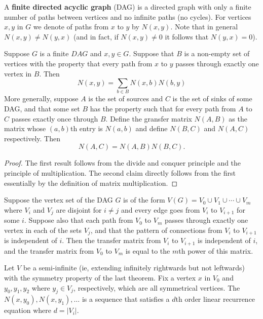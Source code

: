 \begin{definition}
A \textbf{finite directed acyclic graph} (DAG) is a directed graph with only a finite number of paths between vertices and no infinite paths (no cycles). For vertices $x, y$ in $G$ we denote of paths from $x$ to $y$ by $N(x, y)$. Note that in general $N(x, y) \neq N(y, x)$ (and in fact, if $N(x, y) \neq 0$ it follows that $N(y, x) = 0$).
\end{definition}

\begin{theorem}
Suppose $G$ is a finite $DAG$ and $x, y \in G$. Suppose that $B$ is a non-empty set of vertices with the property that every path from $x$ to $y$ passes through exactly one vertex in $B$. Then
\[N(x, y) = \sum_{b \in B}N(x, b)N(b, y)\]
More generally, suppose $A$ is the set of sources and $C$ is the set of sinks of some DAG, and that some set $B$ has the property such that for every path from $A$ to $C$ passes exactly once through $B$. Define the gransfer matrix $N(A, B)$ as the matrix whose $(a, b)$th entry is $N(a, b)$ and define $N(B, C)$ and $N(A, C)$ respectively. Then
\[N(A, C) = N(A, B)N(B, C).\]
\end{theorem}
\begin{proof}
The first result follows from the divide and conquer principle and the principle of multiplication. The second claim directly follows from the first essentially by the definition of matrix multiplication.
\end{proof}

\begin{theorem}
Suppose the vertex set of the DAG $G$ is of the form $V(G) = V_0 \cup V_1 \cup \cdots \cup V_m$ where $V_i$ and $V_j$ are disjoint for $i \neq j$ and every edge goes from $V_i$ to $V_{i + 1}$ for some $i$. Suppose also that each path from $V_0$ to $V_m$ passes through exactly one vertex in each of the sets $V_j$, and that the pattern of connections from $V_i$ to $V_{i + 1}$ is independent of $i$. Then the transfer matrix from $V_i$ to $V_{i + 1}$ is independent of $i$, and the transfer matrix from $V_0$ to $V_m$ is equal to the $m$th power of this matrix.
\end{theorem}

\begin{theorem}
Let $V$ be a semi-infinite (ie, extending infinitely rightwards but not leftwards) with the symmetry property of the last theorem. Fix a vertex $x$ in $V_0$ and $y_0, y_1, y_2$ where $y_j \in V_j$, respectively, which are all symmetrical vertices. The $N(x, y_0), N(x, y_1), \dots$ is a sequence that satisfies a $d$th order linear recurrence equation where $d = |V_i|$.
\end{theorem}
